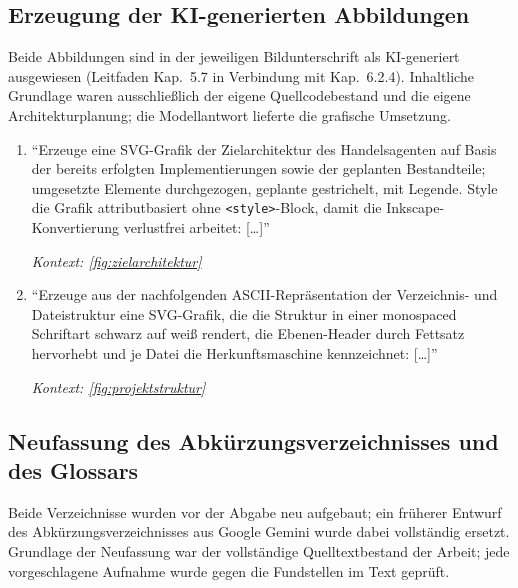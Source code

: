 \subsection{Erzeugung der KI-generierten Abbildungen}
\label{sec:prompts-fable-abbildungen}

Beide Abbildungen sind in der jeweiligen Bildunterschrift als KI-generiert
ausgewiesen (Leitfaden Kap.~5.7 in Verbindung mit Kap.~6.2.4). Inhaltliche
Grundlage waren ausschließlich der eigene Quellcodebestand und die eigene
Architekturplanung; die Modellantwort lieferte die grafische Umsetzung.

\begin{enumerate}
    \item \enquote{Erzeuge eine SVG-Grafik der Zielarchitektur des
            Handelsagenten auf Basis der bereits erfolgten Implementierungen
            sowie der geplanten Bestandteile; umgesetzte Elemente
            durchgezogen, geplante gestrichelt, mit Legende. Style die Grafik
            attributbasiert ohne \texttt{<style>}-Block, damit die
            Inkscape-Konvertierung verlustfrei arbeitet: [\dots]}
            \par\hfill\textit{Kontext: \cref{fig:zielarchitektur}}

    \item \enquote{Erzeuge aus der nachfolgenden ASCII-Repräsentation der
            Verzeichnis- und Dateistruktur eine SVG-Grafik, die die Struktur
            in einer monospaced Schriftart schwarz auf weiß rendert, die
            Ebenen-Header durch Fettsatz hervorhebt und je Datei die
            Herkunftsmaschine kennzeichnet: [\dots]}
            \par\hfill\textit{Kontext: \cref{fig:projektstruktur}}
\end{enumerate}

\subsection{Neufassung des Abkürzungsverzeichnisses und des Glossars}
\label{sec:prompts-fable-verzeichnisse}

Beide Verzeichnisse wurden vor der Abgabe neu aufgebaut; ein früherer
Entwurf des Abkürzungsverzeichnisses aus Google Gemini wurde dabei
vollständig ersetzt. Grundlage der Neufassung war der vollständige
Quelltextbestand der Arbeit; jede vorgeschlagene Aufnahme wurde gegen die
Fundstellen im Text geprüft.

